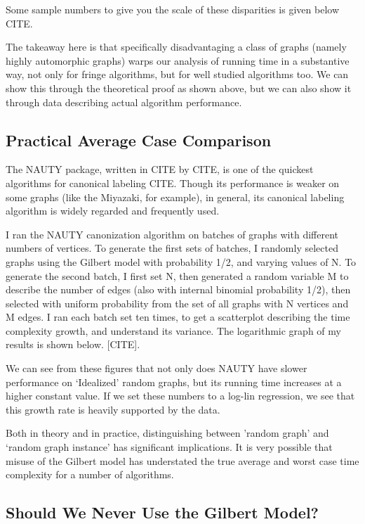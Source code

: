 \documentclass[11pt,a4paper]{report}
\begin{document}
Some sample numbers to give you the scale of these disparities is given below CITE.

The takeaway here is that specifically disadvantaging a class of graphs (namely highly automorphic graphs) warps our analysis of running time in a substantive way, not only for fringe algorithms, but for well studied algorithms too.
We can show this through the theoretical proof as shown above, but we can also show it through data describing actual algorithm performance.

\subsection{Practical Average Case Comparison}

The NAUTY package, written in CITE by CITE, is one of the quickest algorithms for canonical labeling CITE.
Though its performance is weaker on some graphs (like the Miyazaki, for example), in general, its canonical labeling algorithm is widely regarded and frequently used.

I ran the NAUTY canonization algorithm on batches of graphs with different numbers of vertices.
To generate the first sets of batches, I randomly selected graphs using the Gilbert model with probability 1/2, and varying values of N.
To generate the second batch, I first set N, then generated a random variable M to describe the number of edges (also with internal binomial probability 1/2), then selected with uniform probability from the set of all graphs with N vertices and M edges.
I ran each batch set ten times, to get a scatterplot describing the time complexity growth, and understand its variance.
The logarithmic graph of my results is shown below.  [CITE].

We can see from these figures that not only does NAUTY have slower performance on `Idealized' random graphs, but its running time increases at a higher constant value.
If we set these numbers to a log-lin regression, we see that this growth rate is heavily supported by the data.

Both in theory and in practice, distinguishing between 'random graph' and `random graph instance' has significant implications.
It is very possible that misuse of the Gilbert model has understated the true average and worst case time complexity for a number of algorithms.

\subsection{Should We Never Use the Gilbert Model?}
\end{document}
